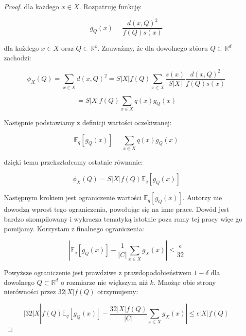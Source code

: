 \begin{proof}
\noindent
dla każdego $x \in X$. Rozpatruję funkcję:

\begin{equation}
    g_{Q}(x) = \frac{d(x, Q)^2}{f(Q)s(x)}
\end{equation}

\noindent
dla każdego $x \in X$ oraz $Q \subset \mathbb{R^d}$.
Zauważmy, że dla dowolnego zbioru  $Q \subset \mathbb{R}^{d}$ zachodzi:

\begin{equation}
    \phi_{X}(Q) = \sum_{x \in X} d(x, Q)^2 = S|X|f(Q) \sum_{x \in X} \frac{s(x)}{S|X|} \frac{d(x, Q)^2}{f(Q)s(x)}
\end{equation}

\begin{equation}
    =  S|X|f(Q) \sum_{x \in X} q(x) g_{Q}(x)
\end{equation}

\noindent
Następnie podstawiamy z definicji wartości oczekiwanej:

\begin{equation}
    \mathbb{E}_q[g_{Q}(x)] = \sum _{x \in X} q(x) g_{Q}(x)
\end{equation}

\noindent
dzięki temu przekształcamy ostatnie równanie:

\begin{equation}
    \phi_{X}(Q) = S|X|f(Q)\mathbb{E}_q[g_{Q}(x)]
\end{equation}

\noindent
Następnym krokiem jest ograniczenie wartości $\mathbb{E}_q[g_{Q}(x)]$.
Autorzy \cite{bachem2017scalable} nie dowodzą wprost tego ograniczenia, powołując się na inne prace.
Dowód jest bardzo skompilowany i wykracza tematyką istotnie poza ramy tej pracy więc go pomijamy.
Korzystam z finalnego ograniczenia:

\begin{equation}
    |\mathbb{E}_q[g_{Q}(x)] - \frac{1}{|C|} \sum_{x \in X}g_{X}(x)| \leq \frac{\epsilon}{32}
\end{equation}

\noindent
Powyższe ograniczenie jest prawdziwe z prawdopodobieństwem $1 - \delta$ dla dowolnego $Q \subset \mathbb{R}^{d}$ o rozmiarze nie większym niż $k$.
Mnożąc obie strony nierówności przez $32|X|f(Q)$ otrzymujemy:

\begin{equation}
    |32|X|f(Q)\mathbb{E}_q[g_{Q}(x)] - \frac{32|X|f(Q)}{|C|} \sum_{x \in X}g_{X}(x)| \leq \epsilon|X|f(Q)
\end{equation}


\end{proof}
